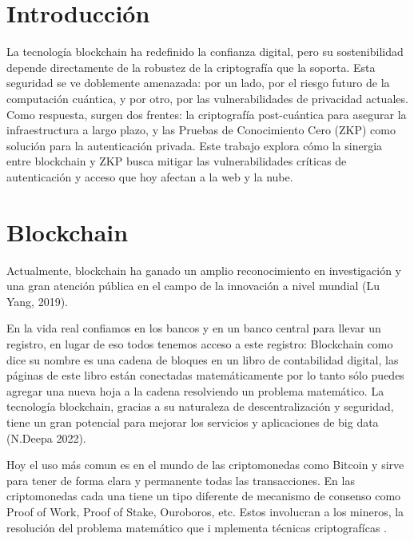 \documentclass[conference]{IEEEtran}
\begin{document}
\section{Introducción}
La tecnología blockchain ha redefinido la confianza digital, pero su sostenibilidad 
depende directamente de la robustez de la criptografía que la soporta. Esta seguridad 
se ve doblemente amenazada: por un lado, por el riesgo futuro de la computación 
cuántica, y por otro, por las vulnerabilidades de privacidad actuales. Como respuesta, 
surgen dos frentes: la criptografía post-cuántica para asegurar la infraestructura a 
largo plazo, y las Pruebas de Conocimiento Cero (ZKP) como solución para la 
autenticación privada. Este trabajo explora cómo la sinergia entre blockchain y ZKP 
busca mitigar las vulnerabilidades críticas de autenticación y acceso que hoy afectan 
a la web y la nube.

\section{Blockchain}

Actualmente, blockchain ha ganado un amplio reconocimiento en investigación y una
gran atención pública en el campo de la innovación a nivel mundial (Lu Yang, 2019).

En la vida real confiamos en los bancos y en un banco central para llevar un registro, 
en lugar de eso todos tenemos acceso a este registro: Blockchain como dice su nombre es 
una cadena de bloques en un libro de contabilidad digital, las páginas de este libro están 
conectadas matemáticamente por lo tanto sólo puedes agregar una nueva hoja a la cadena 
resolviendo un problema matemático. La tecnología blockchain, gracias a su naturaleza de 
descentralización y seguridad, tiene un gran potencial para mejorar los servicios y aplicaciones de big data (N.Deepa 2022). 

Hoy el uso más comun es en el mundo de las criptomonedas como Bitcoin y sirve para tener de forma clara y permanente 
todas las transacciones. En las criptomonedas cada una tiene un tipo diferente de mecanismo de 
consenso como Proof of Work, Proof of Stake, Ouroboros, etc. Estos involucran a los mineros, 
la resolución del problema matemático que i mplementa técnicas criptografícas .
\end{document}
